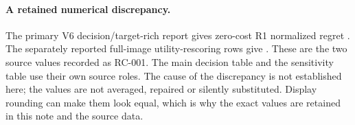 \paragraph{A retained numerical discrepancy.}
The primary V6 decision/target-rich report gives zero-cost R1 normalized
regret . The separately reported full-image
utility-rescoring rows give . These are
the two source values recorded as RC-001. The main decision table and the
sensitivity table use their own source roles. The cause of the discrepancy
is not established here; the values are not averaged, repaired or silently
substituted. Display rounding can make them look equal, which is why the
exact values are retained in this note and the source data.

